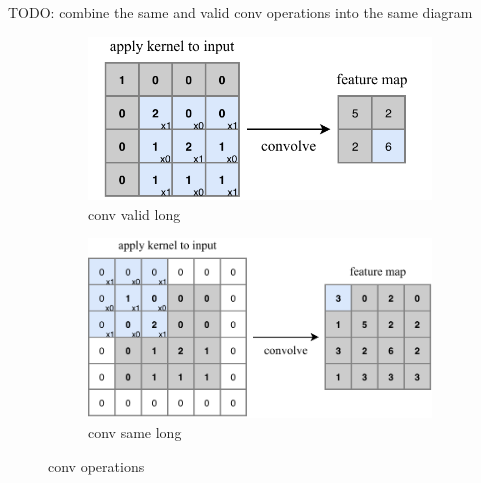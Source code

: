 TODO: combine the same and valid conv operations into the same diagram
\begin{figure} %
    \centering
    \begin{subfigure}[b]{0.71\textwidth}
        \centering
        \includegraphics[width=\textwidth]{diagrams/7-cvn/conv_valid.pdf}
        \caption{conv valid long}
        \label{fig:conv_valid}
    \end{subfigure}
    \hfill
    \begin{subfigure}[b]{0.9\textwidth}
        \centering
        \includegraphics[width=\textwidth]{diagrams/7-cvn/conv_same.pdf}
        \caption{conv same long}
        \label{fig:conv_same}
    \end{subfigure}
    \caption{conv operations}
    \label{fig:conv_operations}
\end{figure} %


